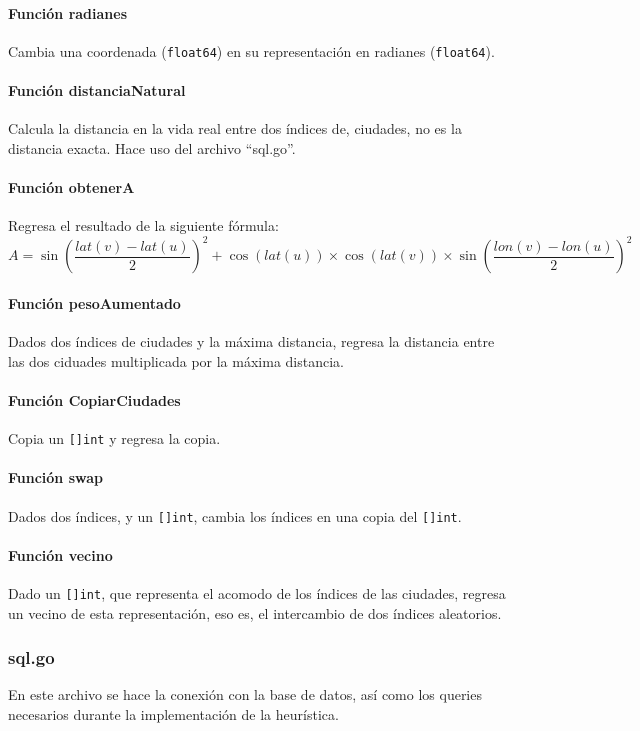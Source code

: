 \documentclass[
10pt,
a4paper,
oneside,
headinclude,footinclude,
BCOR5mm,
]{article}
\begin{document}
\paragraph{Función radianes} Cambia una coordenada (\texttt{float64}) en su
representación en radianes (\texttt{float64}).
\paragraph{Función distanciaNatural} Calcula la distancia en la vida real entre
dos índices de, ciudades, no es la distancia exacta. Hace uso del archivo
``sql.go''.
\paragraph{Función obtenerA} Regresa el resultado de la siguiente fórmula:
\begin{equation}
  A = \sin(\frac{lat(v)- lat(u)}{2})^{2} + \cos(lat(u)) \times \cos(lat(v)) \times
  \sin(\frac{lon(v) - lon(u)}{2})^{2}
\label{eq:refname2}
\end{equation}

\paragraph{Función pesoAumentado} Dados dos índices de ciudades y la máxima distancia,
regresa la distancia entre las dos ciduades multiplicada por la máxima distancia.
\paragraph{Función CopiarCiudades} Copia un \texttt{[]int} y regresa la copia.
\paragraph{Función swap} Dados dos índices, y un \texttt{[]int}, cambia los índices en
una copia del \texttt{[]int}.
\paragraph{Función vecino} Dado un \texttt{[]int}, que representa el acomodo de los
índices de las ciudades, regresa un vecino de esta representación, eso es, el
intercambio de dos índices aleatorios.


\subsubsection{sql.go}
En este archivo se hace la conexión con la base de datos, así como los queries
necesarios durante la implementación de la heurística.
\end{document}
